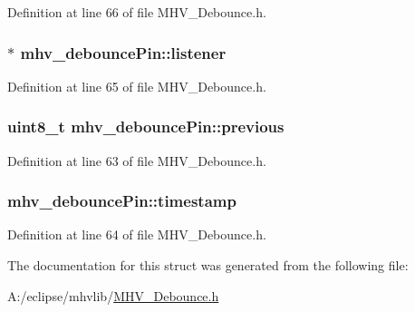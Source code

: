 \-Definition at line 66 of file \-M\-H\-V\-\_\-\-Debounce.\-h.

\hypertarget{structmhv__debounce_pin_aa7c133ca2e2edc8c1df591ef842432b9}{
\subsubsection[{listener}]{$\ast$ {\bf mhv\-\_\-debounce\-Pin\-::listener}}}
\label{structmhv__debounce_pin_aa7c133ca2e2edc8c1df591ef842432b9}


\-Definition at line 65 of file \-M\-H\-V\-\_\-\-Debounce.\-h.

\hypertarget{structmhv__debounce_pin_ac811cadb60a02f9b98876e62bb8df8fc}{
\subsubsection[{previous}]{\setlength{\rightskip}{0pt plus 5cm}uint8\-\_\-t {\bf mhv\-\_\-debounce\-Pin\-::previous}}}
\label{structmhv__debounce_pin_ac811cadb60a02f9b98876e62bb8df8fc}


\-Definition at line 63 of file \-M\-H\-V\-\_\-\-Debounce.\-h.

\hypertarget{structmhv__debounce_pin_a0d8a978d0e2cb1677e30b174986583f2}{
\subsubsection[{timestamp}]{ {\bf mhv\-\_\-debounce\-Pin\-::timestamp}}}
\label{structmhv__debounce_pin_a0d8a978d0e2cb1677e30b174986583f2}


\-Definition at line 64 of file \-M\-H\-V\-\_\-\-Debounce.\-h.



\-The documentation for this struct was generated from the following file\-:\begin{DoxyCompactItemize}
\item 
\-A\-:/eclipse/mhvlib/\hyperlink{_m_h_v___debounce_8h}{\-M\-H\-V\-\_\-\-Debounce.\-h}\end{DoxyCompactItemize}
